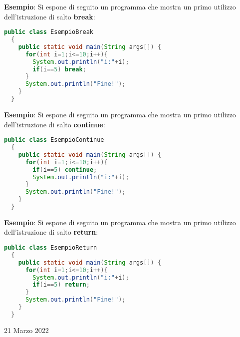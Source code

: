 \documentclass[a4paper]{extarticle}
\begin{document}
\newpage
\noindent
\textbf{Esempio}: Si espone di seguito un programma che mostra un primo utilizzo dell'istruzione di salto \textbf{break}:

\vspace{1em}
\noindent
\begin{lstlisting}[language=Java, caption=Istruzione di salto break in Java]
  public class EsempioBreak
  {
    public static void main(String args[]) {
      for(int i=1;i<=10;i++){
        System.out.println("i:"+i);
        if(i==5) break;
      }
      System.out.println("Fine!");
    }
  }
\end{lstlisting}

\vspace{1em}
\noindent
\textbf{Esempio}: Si espone di seguito un programma che mostra un primo utilizzo dell'istruzione di salto \textbf{continue}:

\vspace{1em}
\noindent
\begin{lstlisting}[language=Java, caption=Istruzione di salto continue in Java]
  public class EsempioContinue
  {
    public static void main(String args[]) {
      for(int i=1;i<=10;i++){
        if(i==5) continue;
        System.out.println("i:"+i);
      }
      System.out.println("Fine!");
    }
  }
\end{lstlisting}

\vspace{1em}
\noindent
\textbf{Esempio}: Si espone di seguito un programma che mostra un primo utilizzo dell'istruzione di salto \textbf{return}:

\vspace{1em}
\noindent
\begin{lstlisting}[language=Java, caption=Istruzione di salto return in Java]
  public class EsempioReturn
  {
    public static void main(String args[]) {
      for(int i=1;i<=10;i++){
        System.out.println("i:"+i);
        if(i==5) return;
      }
      System.out.println("Fine!");
    }
  }
\end{lstlisting}

\newpage
\begin{center}
  21 Marzo 2022
\end{center}
\end{document}
